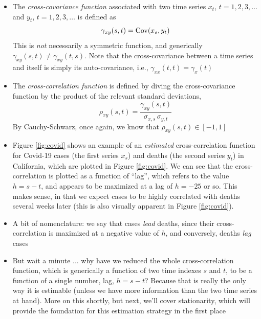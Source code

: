\documentclass{article}
\begin{document}
\begin{itemize}
\item The \emph{cross-covariance function} associated with two time series $x_t$, 
  $t = 1,2,3,\dots$ and $y_t$, $t = 1,2,3,\dots$ is defined as
  \[
  \gamma_{xy}(s,t) = \operatorname{Cov}(x_s, y_t)
  \]
  This is \emph{not} necessarily a symmetric function, and generically
  $\gamma_{xy}(s,t) \not= \gamma_{xy}(t,s)$. Note that the cross-covariance
  between a time series and itself is simply its auto-covariance, i.e.,
  $\gamma_{xx}(t,t) = \gamma_x(t)$

\item The \emph{cross-correlation function} is defined by diving the
  cross-covariance function by the product of the relevant standard deviations, 
  \[
  \rho_{xy}(s,t) = \frac{\gamma_{xy}(s,t)}{\sigma_{x,s} \, \sigma_{y,t}}
  \]
  By Cauchy-Schwarz, once again, we know that $\rho_{xy}(s,t) \in [-1,1]$

\item Figure \ref{fig:covid} shows an example of an \emph{estimated}
  cross-correlation function for Covid-19 cases (the first series $x_s$) and 
  deaths (the second series $y_t$) in California, which are plotted in Figure
  \ref{fig:covid}. We can see that the cross-correlation is plotted as a
  function of ``lag'', which refers to the value $h = s-t$, and appears to be  
  maximized at a lag of $h = -25$ or so. This makes sense, in that we expect
  cases to be highly correlated with deaths several weeks later (this is also
  visually apparent in Figure \ref{fig:covid}). 

\item A bit of nomenclature: we say that cases \emph{lead} deaths, since their
  cross-correlation is maximized at a negative value of $h$, and conversely, 
  deaths \emph{lag} cases  

\item  But wait a minute ... why have we reduced the whole cross-correlation 
  function, which is generically a function of two time indexes $s$ and $t$, to
  be a function of a single number, lag, $h = s-t$? Because that is really the
  only way it is estimable (unless we have more information than the two time
  series at hand). More on this shortly, but next, we'll cover stationarity,
  which will provide the foundation for this estimation strategy in the first
  place 
\end{itemize}
\end{document}
